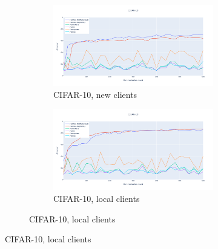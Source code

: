 \documentclass[oneside,a4paper,14pt]{extreport}
\begin{document}
\begin{figure}
    \centering
    \begin{subfigure}{\textwidth}
        \centering
        \begin{subfigure}{.5\textwidth}
            \centering
            \includegraphics[width=\linewidth]{./tab_img/cifar_per_new.png}
            \caption{CIFAR-10, new clients}
            \label{fig:cifar_per_new}
        \end{subfigure}%
        \begin{subfigure}{.5\textwidth}
            \centering
            \includegraphics[width=\linewidth]{./tab_img/cifar_per_old.png}
            \caption{CIFAR-10, local clients}
            \label{fig:cifar_per_old}
        \end{subfigure}
    \end{subfigure}


\end{figure}
\end{document}
